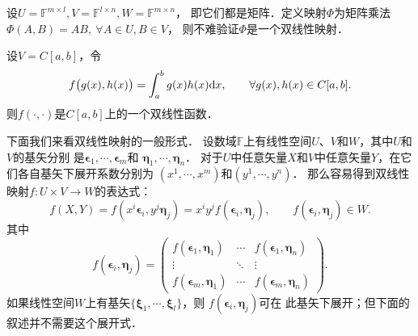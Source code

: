 \begin{example}
    设$U=\mathbb{F}^{m\times l}, V=\mathbb{F}^{l\times n}, W=\mathbb{F}^{m\times n}$，
    即它们都是矩阵．定义映射$\Phi$为矩阵乘法$\Phi(A,B)=AB, \ \forall A\in U, B\in V$，
    则不难验证$\Phi$是一个双线性映射．
\end{example}

\begin{example}
    设$V=C[a,b]$，令
    \begin{equation}
        f\bigl( g(x), h(x)\bigr) = \int_{a}^{b} g(x) h(x) {\rm d}x,
        \qquad \forall g(x), h(x)\in C[a,b].
    \end{equation}
    则$f(\cdot,\cdot)$是$C[a,b]$上的一个双线性函数．
\end{example}


下面我们来看双线性映射的一般形式．
    设数域$\mathbb{F}$上有线性空间$U$、$V$和$W$，其中$U$和$V$的基矢分别
    是$\boldsymbol{\epsilon}_1, \cdots, \boldsymbol{\epsilon}_m$和
    $\boldsymbol{\eta}_1, \cdots, \boldsymbol{\eta}_n$．
    对于$U$中任意矢量$X$和$V$中任意矢量$Y$，在它们各自基矢下展开系数分别为
    $(x^1,\cdots,x^m)$和$(y^1,\cdots,y^n)$．
    那么容易得到双线性映射$f:U\times V \to W$的表达式：
    \begin{equation}\label{chmla:eqn_fxy-expand}
        f(X,Y)  = f\left( x^i \boldsymbol{\epsilon}_i, y^j \boldsymbol{\eta}_j\right)
        = x^i y^j f\left( \boldsymbol{\epsilon}_i,  \boldsymbol{\eta}_j\right) ,
        \qquad f\left( \boldsymbol{\epsilon}_i,  \boldsymbol{\eta}_j\right)  \in W.
    \end{equation}
    其中
    \begin{equation}\label{chmla:eqn_metricij}
        f\left( \boldsymbol{\epsilon}_i,  \boldsymbol{\eta}_j\right) =
        \begin{pmatrix}
            f\left( \boldsymbol{\epsilon}_1,  \boldsymbol{\eta}_1\right)  &  \cdots &
            f\left( \boldsymbol{\epsilon}_1,  \boldsymbol{\eta}_n\right)  \\
            \vdots & \ddots & \vdots \\
            f\left( \boldsymbol{\epsilon}_m,  \boldsymbol{\eta}_1\right)  & \cdots &
            f\left( \boldsymbol{\epsilon}_m,  \boldsymbol{\eta}_n\right)
        \end{pmatrix}.
    \end{equation}
如果线性空间$W$上有基矢$\{\boldsymbol{\xi}_1,\cdots,\boldsymbol{\xi}_l \}$，则
$f\left( \boldsymbol{\epsilon}_i,  \boldsymbol{\eta}_j\right) $可在
此基矢下展开；但下面的叙述并不需要这个展开式．
    

